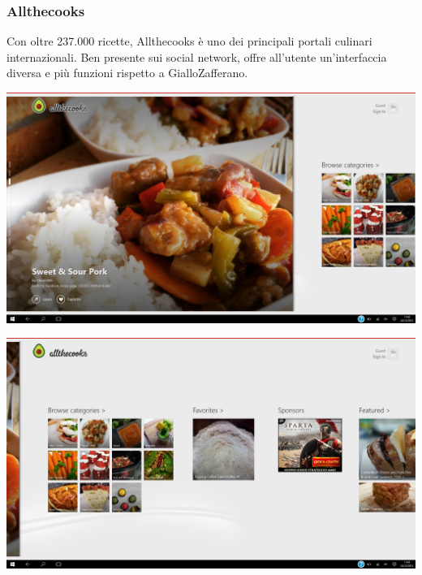 \subsubsection*{Allthecooks}
Con oltre 237.000 ricette, Allthecooks è uno dei principali portali culinari internazionali. Ben presente sui social network, offre all'utente un'interfaccia diversa e più funzioni rispetto a GialloZafferano.\\


\begin{center}
\includegraphics[scale=0.275] {img/Allthecooks/home.png}  
\end{center}


\begin{center}
\includegraphics[scale=0.275] {img/Allthecooks/home_2.png}  
\end{center}


